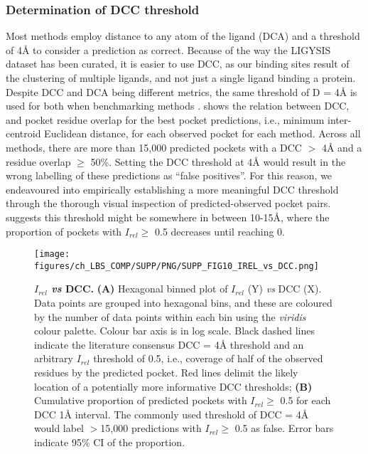 \subsubsection{Determination of DCC threshold}

Most methods employ distance to any atom of the ligand (DCA) and a threshold of 4\AA{} to consider a prediction as correct. Because of the way the LIGYSIS dataset has been curated, it is easier to use DCC, as our binding sites result of the clustering of multiple ligands, and not just a single ligand binding a protein. Despite DCC and DCA being different metrics, the same threshold of D = 4\AA{} is used for both when benchmarking methods \cite{AGGARWAL_2022_DEEPPOCKET, SESTAK_2024_VNEGNN, KANDEL_2021_PURESNET}.  shows the relation between DCC, and pocket residue overlap for the best pocket predictions, i.e., minimum inter-centroid Euclidean distance, for each observed pocket for each method. Across all methods, there are more than 15,000 predicted pockets with a DCC $>$ 4\AA{} and a residue overlap $\geq$ 50\%. Setting the DCC threshold at 4\AA{} would result in the wrong labelling of these predictions as ``false positives''. For this reason, we endeavoured into empirically establishing a more meaningful DCC threshold through the thorough visual inspection of predicted-observed pocket pairs.  suggests this threshold might be somewhere in between 10-15\AA{}, where the proportion of pockets with $I_{rel} \geq$ 0.5 decreases until reaching 0.

\begin{figure}[ht!]
    \centering
    \texttt{[image: figures/ch\_LBS\_COMP/SUPP/PNG/SUPP\_FIG10\_IREL\_vs\_DCC.png]}
    \caption[$I_{rel}$ \textit{vs} DCC]{\textbf{$I_{rel}$ \textit{vs} DCC.} \textbf{(A)} Hexagonal binned plot of $I_{rel}$ (Y) \textit{vs} DCC (X). Data points are grouped into hexagonal bins, and these are coloured by the number of data points within each bin using the \textit{viridis} colour palette. Colour bar axis is in log scale. Black dashed lines indicate the literature consensus DCC = 4\AA{} threshold and an arbitrary $I_{rel}$ threshold of 0.5, i.e., coverage of half of the observed residues by the predicted pocket.  Red lines delimit the likely location of a potentially more informative DCC thresholds; \textbf{(B)} Cumulative proportion of predicted pockets with $I_{rel} \geq$ 0.5 for each DCC 1\AA{} interval. The commonly used threshold of DCC = 4\AA{} would label $>$15,000 predictions with $I_{rel} \geq$ 0.5 as false. Error bars indicate 95\% CI of the proportion.}
    \label{fig:irel_vs_dcc}
\end{figure}

